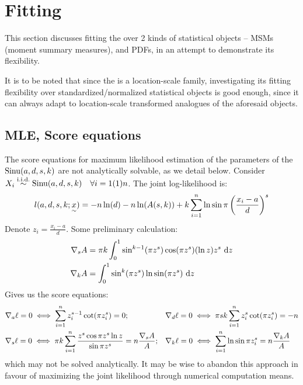 \section{Fitting}
This section discusses fitting the \sindist{} over 2 kinds of statistical objects -- MSMs (moment summary measures), and PDFs, in an attempt to demonstrate its flexibility.

It is to be noted that since the \sindist{} is a location-scale family, investigating its fitting flexibility over standardized/normalized statistical objects is good enough, since it can always adapt to location-scale transformed analogues of the aforesaid objects.

\subsection{MLE, Score equations}
The score equations for maximum likelihood estimation of the parameters of the \sindist{} $\operatorname*{Sinu}(a,d,s,k)$ are not analytically solvable, as we detail below. Consider $X_i \mathrel{\overset{\text{i.i.d.}}{\sim}} \operatorname*{Sinu}(a,d,s,k) \quad \forall i=1(1)n$. The joint log-likelihood is:
\begin{equation*}
    l(a,d,s,k; \underset{\sim}{x})
    = -n\ln(d)-n\ln(A(s,k)) + k\sum_{i=1}^n \ln \sin \pi\left( x_i-a \over d \right)^s
\end{equation*}
Denote $z_i = \frac{x_i -a}{d}$. Some preliminary calculation:
\begin{align*}
    \nabla_s A &= \pi k \int_0^1 \sin^{k-1}(\pi z^s) \cos(\pi z^s) (\ln z) z^s \ \mathrm d z\\
    \nabla_k A &= \int_0^1 \sin^k(\pi z^s) \ln \sin(\pi z^s) \ \mathrm d z
\end{align*}
Gives us the score equations:
\begin{align*}
    &\nabla_a \ell = 0 \iff \sum_{i=1}^n z_i^{s-1} \cot(\pi z_i^s) = 0;  && \nabla_d \ell = 0 \iff \pi sk \sum_{i=1}^n z_i^s \cot(\pi z_i^s) = -n \\
    &\nabla_s \ell = 0 \iff  \pi k \sum_{i=1}^n {z^s \cos \pi z^s \ln z  \over \sin \pi z^s} = n {\nabla_s A \over A};  &&  \nabla_k \ell = 0 \iff \sum_{i=1}^n \ln \sin \pi z_i^s = n{\nabla_k A \over A}
\end{align*}
which may not be solved analytically. It may be wise to abandon this approach in favour of maximizing the joint likelihood through numerical computation means.

